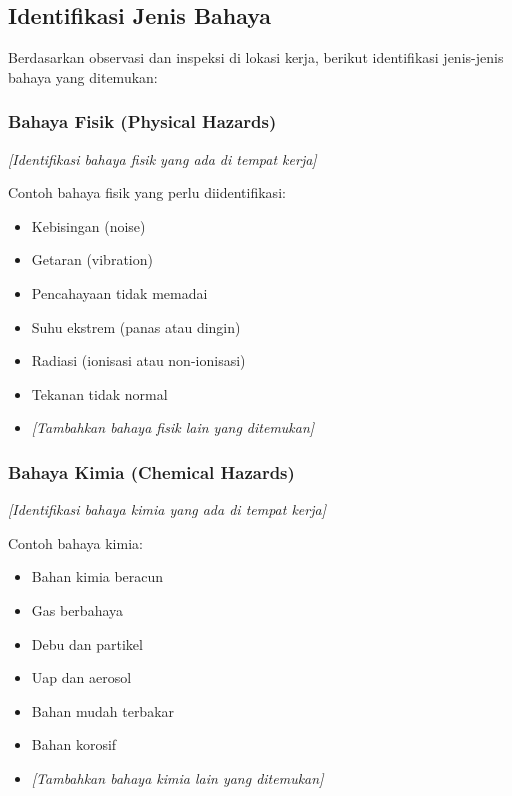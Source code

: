 
\subsection{Identifikasi Jenis Bahaya}
\label{subsec:identifikasi-bahaya}


Berdasarkan observasi dan inspeksi di lokasi kerja, berikut identifikasi jenis-jenis bahaya yang ditemukan:

\subsubsection{Bahaya Fisik (Physical Hazards)}

\textit{[Identifikasi bahaya fisik yang ada di tempat kerja]}

Contoh bahaya fisik yang perlu diidentifikasi:
\begin{itemize}
    \item Kebisingan (noise)
    \item Getaran (vibration)
    \item Pencahayaan tidak memadai
    \item Suhu ekstrem (panas atau dingin)
    \item Radiasi (ionisasi atau non-ionisasi)
    \item Tekanan tidak normal
    \item \textit{[Tambahkan bahaya fisik lain yang ditemukan]}
\end{itemize}

\vspace{0.5cm}

\subsubsection{Bahaya Kimia (Chemical Hazards)}

\textit{[Identifikasi bahaya kimia yang ada di tempat kerja]}

Contoh bahaya kimia:
\begin{itemize}
    \item Bahan kimia beracun
    \item Gas berbahaya
    \item Debu dan partikel
    \item Uap dan aerosol
    \item Bahan mudah terbakar
    \item Bahan korosif
    \item \textit{[Tambahkan bahaya kimia lain yang ditemukan]}
\end{itemize}


